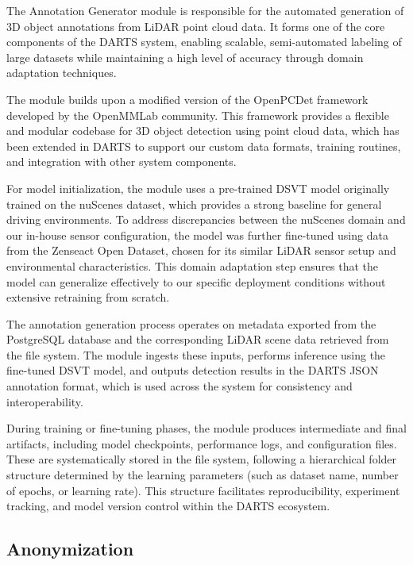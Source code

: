 \documentclass[conference]{IEEEtran}
\begin{document}
The Annotation Generator module is responsible for the automated generation of 3D object annotations from LiDAR point cloud data. It forms one of the core components of the DARTS system, enabling scalable, semi-automated labeling of large datasets while maintaining a high level of accuracy through domain adaptation techniques.

The module builds upon a modified version of the OpenPCDet\cite{openpcdet2020} framework developed by the OpenMMLab community. This framework provides a flexible and modular codebase for 3D object detection using point cloud data, which has been extended in DARTS to support our custom data formats, training routines, and integration with other system components.

For model initialization, the module uses a pre-trained DSVT\cite{WangShi2023} model originally trained on the nuScenes dataset, which provides a strong baseline for general driving environments. To address discrepancies between the nuScenes domain and our in-house sensor configuration, the model was further fine-tuned using data from the Zenseact Open Dataset\cite{zenseact}, chosen for its similar LiDAR sensor setup and environmental characteristics. This domain adaptation step ensures that the model can generalize effectively to our specific deployment conditions without extensive retraining from scratch.

The annotation generation process operates on metadata exported from the PostgreSQL database and the corresponding LiDAR scene data retrieved from the file system. The module ingests these inputs, performs inference using the fine-tuned DSVT model, and outputs detection results in the DARTS JSON annotation format, which is used across the system for consistency and interoperability.

During training or fine-tuning phases, the module produces intermediate and final artifacts, including model checkpoints, performance logs, and configuration files. These are systematically stored in the file system, following a hierarchical folder structure determined by the learning parameters (such as dataset name, number of epochs, or learning rate). This structure facilitates reproducibility, experiment tracking, and model version control within the DARTS ecosystem.

\subsection{Anonymization}
\end{document}
